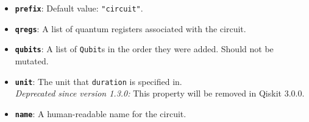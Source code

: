 \begin{itemize}
\textbf{Returns:} The sorted Parameter objects in the circuit.

    \item \textbf{\texttt{prefix}}: Default value: \texttt{"circuit"}.

    \item \textbf{\texttt{qregs}}: A list of quantum registers associated with the circuit.

    \item \textbf{\texttt{qubits}}: A list of \texttt{Qubit}s in the order they were added. Should not be mutated.

    \item \textbf{\texttt{unit}}: The unit that \texttt{duration} is specified in.\\
    \textit{Deprecated since version 1.3.0:} This property will be removed in Qiskit 3.0.0.

    \item \textbf{\texttt{name}}: A human-readable name for the circuit.
\end{itemize}

